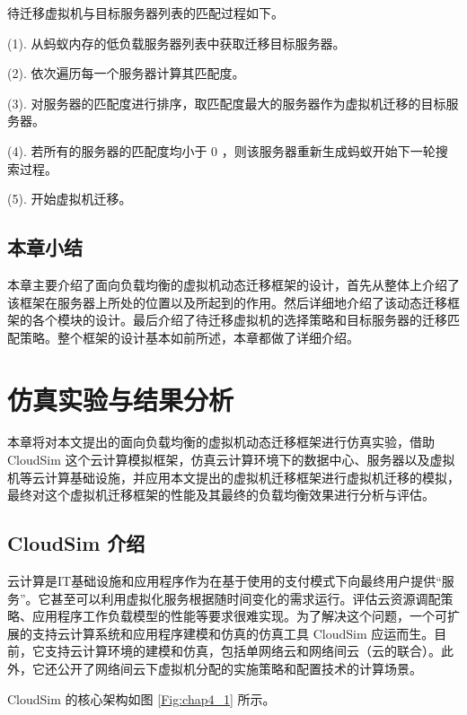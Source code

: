 待迁移虚拟机与目标服务器列表的匹配过程如下。

    (1). 从蚂蚁内存的低负载服务器列表中获取迁移目标服务器。

    (2). 依次遍历每一个服务器计算其匹配度。

    (3). 对服务器的匹配度进行排序，取匹配度最大的服务器作为虚拟机迁移的目标服务器。

    (4). 若所有的服务器的匹配度均小于 0 ，则该服务器重新生成蚂蚁开始下一轮搜索过程。

    (5). 开始虚拟机迁移。

\section{本章小结}
本章主要介绍了面向负载均衡的虚拟机动态迁移框架的设计，首先从整体上介绍了该框架在服务器上所处的位置以及所起到的作用。然后详细地介绍了该动态迁移框架的各个模块的设计。最后介绍了待迁移虚拟机的选择策略和目标服务器的迁移匹配策略。整个框架的设计基本如前所述，本章都做了详细介绍。

\chapter{仿真实验与结果分析}
本章将对本文提出的面向负载均衡的虚拟机动态迁移框架进行仿真实验，借助 CloudSim 这个云计算模拟框架，仿真云计算环境下的数据中心、服务器以及虚拟机等云计算基础设施，并应用本文提出的虚拟机迁移框架进行虚拟机迁移的模拟，最终对这个虚拟机迁移框架的性能及其最终的负载均衡效果进行分析与评估。

\section{CloudSim 介绍}
云计算是IT基础设施和应用程序作为在基于使用的支付模式下向最终用户提供“服务”。它甚至可以利用虚拟化服务根据随时间变化的需求运行。评估云资源调配策略、应用程序工作负载模型的性能等要求很难实现。为了解决这个问题，一个可扩展的支持云计算系统和应用程序建模和仿真的仿真工具 CloudSim 应运而生\cite{Atanasov}。目前，它支持云计算环境的建模和仿真，包括单网络云和网络间云（云的联合）。此外，它还公开了网络间云下虚拟机分配的实施策略和配置技术的计算场景。

CloudSim 的核心架构如图 \ref{Fig:chap4_1} 所示。

